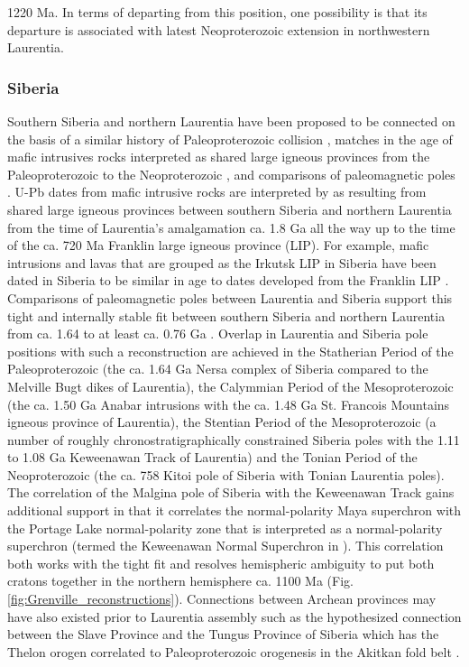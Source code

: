 \documentclass[twocolumn, switch]{article} %
\begin{document}
1220 Ma. In terms of departing from this position, one possibility is that its departure is associated with latest Neoproterozoic extension in northwestern Laurentia.

\subsubsection{Siberia}

Southern Siberia and northern Laurentia have been proposed to be connected on the basis of a similar history of Paleoproterozoic collision \citep{Rainbird1998a}, matches in the age of mafic intrusives rocks interpreted as shared large igneous provinces from the Paleoproterozoic to the Neoproterozoic \citep{Ernst2016a}, and comparisons of paleomagnetic poles \citep{Evans2011a, Evans2016b}. U-Pb dates from mafic intrusive rocks are interpreted by \cite{Ernst2016a} as resulting from shared large igneous provinces between southern Siberia and northern Laurentia from the time of Laurentia's amalgamation ca. 1.8 Ga all the way up to the time of the ca. 720 Ma Franklin large igneous province (LIP). For example, mafic intrusions and lavas that are grouped as the Irkutsk LIP in Siberia have been dated in Siberia to be similar in age to dates developed from the Franklin LIP \citep{Denyszyn2009a, Ernst2016a}. Comparisons of paleomagnetic poles between Laurentia and Siberia support this tight and internally stable fit between southern Siberia and northern Laurentia from ca. 1.64 to at least ca. 0.76 Ga  \citep{Evans2016b}. Overlap in Laurentia and Siberia pole positions with such a reconstruction are achieved in the Statherian Period of the Paleoproterozoic (the ca. 1.64 Ga Nersa complex of Siberia compared to the Melville Bugt dikes of Laurentia), the Calymmian Period of the Mesoproterozoic (the ca. 1.50 Ga Anabar intrusions with the ca. 1.48 Ga St. Francois Mountains igneous province of Laurentia), the Stentian Period of the Mesoproterozoic (a number of roughly chronostratigraphically constrained Siberia poles with the 1.11 to 1.08 Ga Keweenawan Track of Laurentia) and the Tonian Period of the Neoproterozoic (the ca. 758 Kitoi pole of Siberia with Tonian Laurentia poles).  The correlation of the Malgina pole of Siberia with the Keweenawan Track gains additional support in that it correlates the normal-polarity Maya superchron \citep{Gallet2012a} with the Portage Lake normal-polarity zone \citep{Swanson-Hysell2019a} that is interpreted as a normal-polarity superchron (termed the Keweenawan Normal Superchron in \citealp{Driscoll2016a}). This correlation both works with the tight fit and resolves hemispheric ambiguity to put both cratons together in the northern hemisphere ca. 1100 Ma (Fig. \ref{fig:Grenville_reconstructions}). Connections between Archean provinces may have also existed prior to Laurentia assembly such as the hypothesized connection between the Slave Province and the Tungus Province of Siberia which has the Thelon orogen correlated to Paleoproterozoic orogenesis in the Akitkan fold belt \citep{Condie1994a, Rainbird1998a, Evans2011a}.
\end{document}
